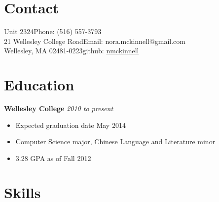 \documentclass[margin,line]{resume}
\begin{document}
\begin{resume}

    \section{\mysidestyle Contact}

    Unit 2324\hfill Phone: (516) 557-3793          \vspace{0mm}\\\vspace{0mm}%
    21 Wellesley College Road\hfill Email: nora.mckinnell@gmail.com  \vspace{0mm}\\\vspace{-4.5mm}%
    Wellesley, MA 02481-0223\hfill github: \href{https://github.com/nmckinnell}{nmckinnell}  \vspace{0mm}\\\vspace{1mm}%
    \section{\mysidestyle Education}

    \textbf{Wellesley College} \hfill \textsl{2010 to present}\vspace{0mm}\\\vspace{-2mm}%
    \begin{itemize}
	\item Expected graduation date May 2014
	\item Computer Science major, Chinese Language and Literature minor
	\item 3.28 GPA as of Fall 2012\vspace{-2mm}\\%
    \end{itemize}
    \section{\mysidestyle Skills} 
	

\end{resume}
\end{document}

